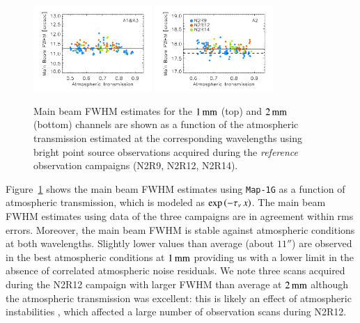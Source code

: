\begin{figure}[!thbp]
\begin{center}
  \includegraphics[clip, width=0.4\textwidth]{Figures/plot_FWHM_vs_atmtrans_mb_radius_binning2_1mm.pdf}
  \includegraphics[clip, width=0.4\textwidth]{Figures/plot_FWHM_vs_atmtrans_mb_radius_binning2_a2.pdf}
  \caption[Main Beam FWHM]{Main beam FWHM estimates for the
    $1\,\rm{mm}$ (top) and $2\,\rm{mm}$ (bottom) channels are shown as
    a function of the atmospheric transmission estimated at the
    corresponding wavelengths using bright point source observations
  acquired during the \emph{reference} observation campaigns (N2R9, N2R12, N2R14).}
\label{fig:fwhm_map_atmtrans}
\end{center}
\end{figure}

Figure~\ref{fig:fwhm_map_atmtrans} shows the main beam FWHM estimates
using {\tt Map-1G} as a function of atmospheric transmission,
which is modeled as $\exp{\left(-\tau_{\nu}\, x\right)}$. %
The main beam FWHM estimates using data of the three campaigns are in
agreement within rms errors. Moreover, the main beam FWHM is stable
against atmospheric conditions at both wavelengths. Slightly lower
values than average (about $11''$) are observed in the best
atmospheric conditions at $1\,\rm{mm}$ providing us with a lower limit
in the absence of correlated atmospheric noise residuals. We note
three scans acquired during the N2R12 campaign with larger FWHM than average at
$2\,\rm{mm}$ although the atmospheric transmission was excellent: this
is likely an effect of atmospheric instabilities%
, which affected a large number of observation scans during N2R12. 

